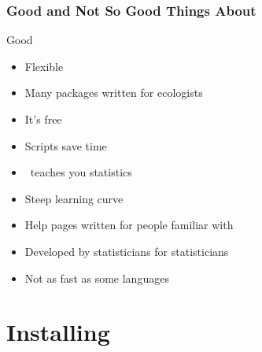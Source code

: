 \documentclass[color=usenames,dvipsnames]{beamer}\usepackage[]{graphicx}\usepackage[]{color}
\begin{document}
\begin{frame}
  \frametitle{Good and Not So Good Things About \R}
  {\Large Good}
  \large
  \begin{itemize}%
    \item<1-> Flexible %
    \item<1-> Many packages written for ecologists
    \item<1-> It's free
    \item<1-> Scripts save time
    \item<1-> \R~teaches you statistics
  \end{itemize}
  \vspace{0.5cm}
  \begin{itemize}
    \item<2-> Steep learning curve
    \item<2-> Help pages written for people familiar with \R
    \item<2-> Developed by statisticians for statisticians
    \item<2-> Not as fast as some languages
  \end{itemize}
\end{frame}








\section{Installing \R}
\end{document}

